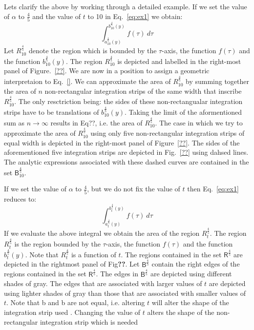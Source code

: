 \documentclass{article}
\theoremstyle{theorem}
\theoremstyle{definition}
\begin{document}
Lets clarify the above by working through a detailed example. If we set the value of $\alpha$ to $\frac{4}{5}$ and the value of $t$ to 10 in Eq.~\eqref{eq:ex1} we obtain:
\begin{equation}
\int_{a_{10}^{\frac{4}{5}}(y)}^{b_{10}^{\frac{4}{5}}(y)} f(\tau)~d\tau 
\end{equation}
Let $R_{10}^{\frac{4}{5}}$ denote the region which is bounded by the $\tau$-axis, the function $f(\tau)$ and the function $b_{10}^{\frac{4}{5}}(y)$. The region $R_{10}^{\frac{4}{5}}$ is depicted and labelled in the right-most panel of Figure.~\ref{??}. We are now in a position to assign a geometric 
interpretaion to Eq.~\eqref{}. We can approximate the area of $R_{10}^{\frac{4}{5}}$ by summing together the area of $n$ non-rectangular integration strips of the same width that inscribe $R_{10}^{\frac{4}{5}}$. The only resctriction being: the sides of these non-rectangualar integration strips have to be translations of $b_{10}^{\frac{4}{5}}(y)$.
Taking the limit of the aformentioned sum as $n\rightarrow \infty$ results in 
Eq??, i.e. the area of $R_{10}^{\frac{4}{5}}$. The case in which we try to approximate the area of $R_{10}^{\frac{4}{5}}$ using only five non-rectangular integration strips of equal width is depicted in the right-most panel of Figure~\ref{??}. The sides of the 
aforementioned five integration strips are depicted in Fig.~\ref{??} using dahsed lines. The analytic expressions associated with these dashed curves are contained in the set $\mathsf{B}_{10}^{\frac{4}{5}}$. 

If we set the value of $\alpha$ to $\frac{4}{5}$, but we do not fix the value of $t$ then Eq.~\eqref{eq:ex1} reduces to:
\begin{equation}
\int_{a_{t}^{\frac{4}{5}}(y)}^{b_{t}^{\frac{4}{5}}(y)} f(\tau)~d\tau 
\end{equation}
If we evaluate the above integral we obtain the area of the region $R_{t}^{\frac{4}{5}}$. The region $R_{t}^{\frac{4}{5}}$ is the region bounded by the $\tau$-axis, the function $f(\tau)$ and the function $b_{t}^{\frac{4}{5}}(y)$.
Note that $R_{t}^{\frac{4}{5}}$ is a function of $t$. The regions contained in the set $\mathsf{R}^{\frac{4}{5}}$ are depicted in the rightmost panel of Fig\textbf{??}. Let $\mathsf{B}^{\frac{4}{5}}$ contain the right 
edges of the regions contained in the set $\mathsf{R}^{\frac{4}{5}}$. The edges in $\mathsf{B}^{\frac{4}{5}}$ are depicted using different shades of gray. The edges that are associated 
with larger values of $t$ are depicted using lighter shades of gray than those that are associated with smaller values of $t$. Note that b and b are not equal, i.e. altering $t$ will alter 
the shape of the integration strip used  . Changing the value of $t$ alters the shape of the non-rectangular integration strip which is needed 
\end{document}
